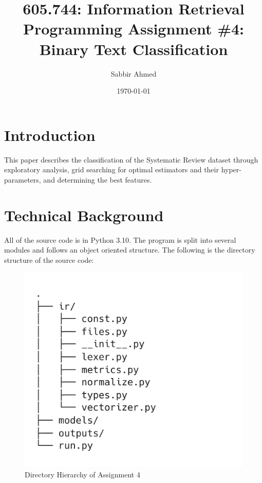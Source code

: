 \documentclass[11pt]{article}
\title{605.744: Information Retrieval \\ Programming Assignment \#4: Binary Text Classification}
\author{Sabbir Ahmed}
\date{\today}
\begin{document}
\maketitle	
\tableofcontents
\clearpage
\newpage

\section*{Introduction}
This paper describes the classification of the Systematic Review dataset through exploratory analysis, grid searching for optimal estimators and their hyper-parameters, and determining the best features.

\section*{Technical Background}
All of the source code is in Python 3.10. The program is split into several modules and follows an object oriented structure. The following is the directory structure of the source code:


\begin{figure}[!ht]
    \centering
    \includegraphics[scale=0.2]{statics/dirtree.png}
    \caption{Directory Hierarchy of Assignment 4}
\end{figure}
\end{document}
